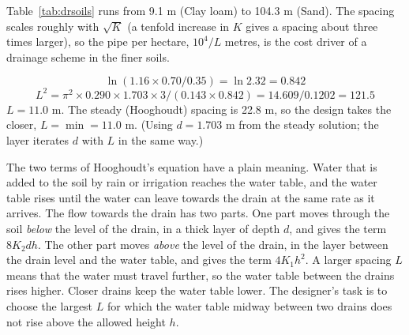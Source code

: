 \begin{keybox}Table~\ref{tab:drsoils} runs from 9.1 m (Clay loam) to 104.3 m (Sand). The spacing scales roughly with $\sqrt K$ (a tenfold increase in $K$ gives a spacing about three times larger), so the pipe per hectare, $10^4/L$ metres, is the cost driver of a drainage scheme in the finer soils.\end{keybox}
\sol {}\ans \[\ln(1.16\times0.70/0.35)=\ln2.32=0.842\]
\[L^2=\pi^2\times0.290\times1.703\times3/(0.143\times0.842)=14.609/0.1202=121.5\]
$L=11.0$ m. The steady (Hooghoudt) spacing is 22.8 m, so the design takes the closer, $L=\min=11.0$ m. (Using $d=1.703$ m from the steady solution; the layer iterates $d$ with $L$ in the same way.) \finans


 The two terms of Hooghoudt's equation have a plain meaning. Water that is added to the soil by rain or irrigation reaches the water table, and the water table rises until the water can leave towards the drain at the same rate as it arrives. The flow towards the drain has two parts. One part moves through the soil \emph{below} the level of the drain, in a thick layer of depth $d$, and gives the term $8K_2dh$. The other part moves \emph{above} the level of the drain, in the layer between the drain level and the water table, and gives the term $4K_1h^2$. A larger spacing $L$ means that the water must travel further, so the water table between the drains rises higher. Closer drains keep the water table lower. The designer's task is to choose the largest $L$ for which the water table midway between two drains does not rise above the allowed height $h$.

